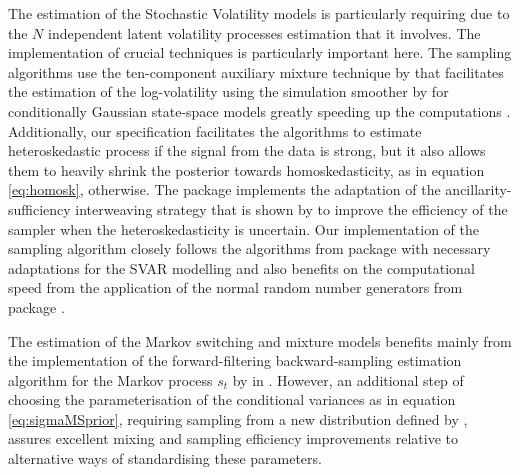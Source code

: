 \documentclass[
  nojss]{jss}
\begin{document}
The estimation of the Stochastic Volatility models is particularly
requiring due to the \(N\) independent latent volatility processes
estimation that it involves. The implementation of crucial techniques is
particularly important here. The sampling algorithms use the
ten-component auxiliary mixture technique by \cite{Omori2007} that
facilitates the estimation of the log-volatility using the simulation
smoother by \cite{mccausland2011simulation} for conditionally Gaussian
state-space models greatly speeding up the computations
\citep[see][for the computational times comparison for various estimation algorithms]{twss_2021}.
Additionally, our specification facilitates the algorithms to estimate
heteroskedastic process if the signal from the data is strong, but it
also allows them to heavily shrink the posterior towards
homoskedasticity, as in equation \eqref{eq:homosk}, otherwise. The
package implements the adaptation of the ancillarity-sufficiency
interweaving strategy that is shown by \cite{Kastner2014} to improve the
efficiency of the sampler when the heteroskedasticity is uncertain. Our
implementation of the sampling algorithm closely follows the algorithms
from package  with necessary adaptations for the SVAR
modelling and also benefits on the computational speed from the
application of the normal random number generators from package
.

The estimation of the Markov switching and mixture models benefits
mainly from the implementation of the forward-filtering
backward-sampling estimation algorithm for the Markov process \(s_t\) by
\cite{Chib1996} in . However, an additional step of
choosing the parameterisation of the conditional variances as in
equation \eqref{eq:sigmaMSprior}, requiring sampling from a new
distribution defined by \cite{Wozniak2015}, assures excellent mixing and
sampling efficiency improvements relative to alternative ways of
standardising these parameters.
\end{document}
